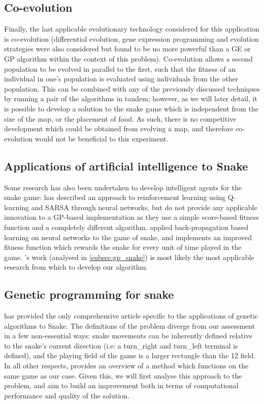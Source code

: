 \documentclass[british,10pt,a4paper]{article}
\begin{document}
\subsection{Co-evolution}
Finally, the last applicable evolutionary technology considered for this application is co-evolution (differential evolution, gene expression programming and evolution strategies were also considered but found to be no more powerful than a GE or GP algorithm within the context of this problem). Co-evolution allows a second population to be evolved in parallel to the first, such that the fitness of an individual in one's population is evaluated using individuals from the other population. This can be combined with any of the previously discussed techniques by running a pair of the algorithms in tandem; however, as we will later detail, it is possible to develop a solution to the snake game which is independent from the size of the map, or the placement of food. As such, there is no competitive development which could be obtained from evolving a map, and therefore co-evolution would not be beneficial to this experiment.


\subsection{Applications of artificial intelligence to Snake}
Some research has also been undertaken to develop intelligent agents for the snake game: \citet{Bowei_Ma_undated-tl} has described an approach to reinforcement learning using Q-learning and SARSA through neural networks, but do not provide any applicable innovation to a GP-based implementation as they use a simple score-based fitness function and a completely different algorithm. \citet{Christopher_Lockhart2010-em} applied back-propagation based learning on neural networks to the game of snake, and implements an improved fitness function which rewards the snake for every unit of time played in the game. \citet{Ehlis2000-sz}'s work (analysed in \autoref{subsec:gp_snake}) is most likely the most applicable research from which to develop our algorithm.

\subsection{Genetic programming for snake}
\label{subsec:gp_snake}
\citet{Ehlis2000-sz} has provided the only comprehensive article specific to the applications of genetic algorithms to Snake. The definitions of the problem diverge from our assessment in a few non-essential ways: snake movements can be inherently defined relative to the snake's current direction (i.e: a turn\_right and turn\_left terminal is defined), and the playing field of the game is a larger rectangle than the 12 field. In all other respects, \citeauthor{Ehlis2000-sz} provides
an overview of a method which functions on the same game as our case. Given this, we will first analyse this approach to the problem, and aim to build an improvement both in terms of computational performance and quality of the solution. \newline
\end{document}
